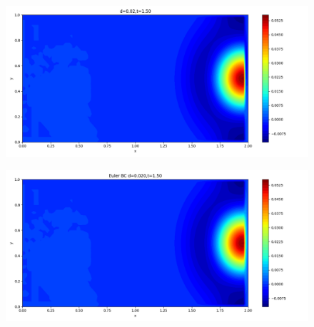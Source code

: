 \documentclass[12pt]{article}
\begin{document}
\begin{figure}[H]
\begin{minipage}{\linewidth}
    \begin{minipage}{0.5\textwidth}
    \includegraphics[width=\linewidth]{figures/3d0.02t1.50.png}
    \label{fig1}
    \end{minipage}\hfill
    \begin{minipage}{0.5\textwidth}
    \includegraphics[width=\linewidth]{figures/3Ed0.020t1.50.png}
    \label{fig2}
    \end{minipage}
    \vspace{-1.5em}
    

\end{minipage}
\end{figure}
\end{document}
